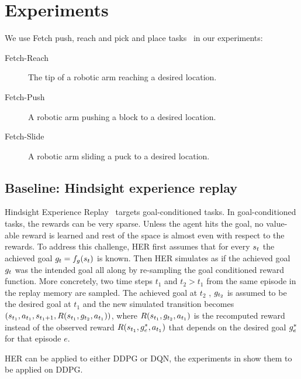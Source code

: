 \section{Experiments}
\label{sec:experiments}
We use Fetch push, reach and pick and place
tasks~\citep{plappert201802multigoalrl} in our experiments:
%
\begin{description}
  \item[Fetch-Reach] The tip of a robotic arm reaching a desired location.
  \item[Fetch-Push] A robotic arm pushing a block to a desired location.
  \item[Fetch-Slide] A robotic arm sliding a puck to a desired location.
\end{description}%
% 
\subsection{Baseline: Hindsight experience replay}
Hindsight Experience Replay~\cite{andrychowicz2016learning} targets
goal-conditioned tasks.
In goal-conditioned tasks, the rewards can be very sparse. Unless the agent hits
the goal, no value-able reward is learned and rest of the space is almost even
with respect to the rewards. To address this challenge, HER first assumes that
for every $s_t$ the achieved goal $g_t = f_g(s_t)$ is known.
Then HER simulates as if the achieved goal $g_t$ was the intended goal all
along by re-sampling the goal conditioned reward function.
More concretely, two time steps $t_1$ and $t_2 > t_1$ from the same episode in the replay memory are
sampled. The achieved goal at $t_2$ , $g_{t_2}$ is assumed to be the desired
goal at $t_1$ and the new simulated transition becomes $(s_{t_1},
a_{t_1}, s_{t_1 + 1}, R(s_{t_1}, g_{t_2}, a_{t_1}))$,
where $R(s_{t_1}, g_{t_2}, a_{t_1})$ is the recomputed reward
instead of the observed reward $R(s_{t_1}, g^*_{e}, a_{t_1})$ that
depends on the desired goal $g^*_{e}$ for that episode $e$.

HER can be applied to either DDPG or DQN, the experiments in
\citet{andrychowicz2016learning} show them to be applied on DDPG.

